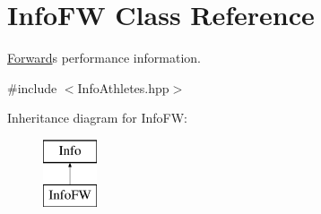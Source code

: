 \hypertarget{class_info_f_w}{}\section{Info\+FW Class Reference}
\label{class_info_f_w}


\hyperlink{class_forward}{Forward}\textquotesingle{}s performance information.  




{\ttfamily \#include $<$Info\+Athletes.\+hpp$>$}

Inheritance diagram for Info\+FW\+:\begin{figure}[H]
\begin{center}
\leavevmode
\includegraphics[height=2.000000cm]{class_info_f_w}
\end{center}
\end{figure}
